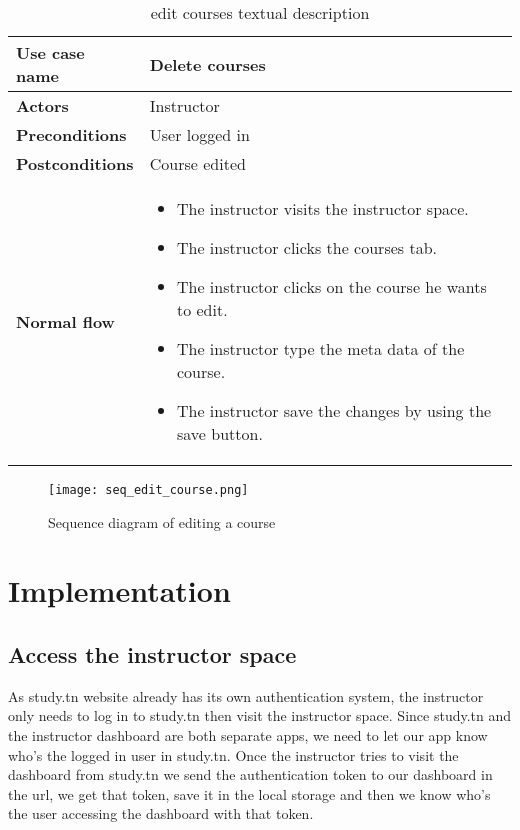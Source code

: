 \begin{table}[H]
\centering
\caption{edit courses textual description}
\begin{tabular}{|p{4cm}|p{10cm}|}
\hline
\textbf{\large{Use case name}} & Delete courses \\\hline
\textbf{\large{Actors}} & Instructor \\\hline
\textbf{\large{Preconditions}} & User logged in \\\hline
\textbf{\large{Postconditions}} & Course edited  \\\hline
\textbf{\large{Normal flow}} & 
\begin{itemize}
  \item The instructor visits the instructor space.
  \item The instructor clicks the courses tab.
  \item The instructor clicks on the course he wants to edit.
  \item The instructor type the meta data of the course.
  \item The instructor save the changes by using the save button.
\end{itemize}
\\\hline

\end{tabular}
\end{table}

\begin{figure}[!ht]
    \centering
    \texttt{[image: seq\_edit\_course.png]}
    \caption{Sequence diagram of editing a course}
    \label{fig:seq_edit_course}
\end{figure}

\vfill
\clearpage

\section{Implementation}

\subsection{Access the instructor space}
As study.tn website already has its own authentication system, the instructor only needs to log in to study.tn then visit the instructor space. Since study.tn and the instructor dashboard are both separate apps, we need to let our app know who's the logged in user in study.tn. Once the instructor tries to visit the dashboard from study.tn we send the authentication token to our dashboard in the url, we get that token, save it in the local storage and then we know who's the user accessing the dashboard with that token.

